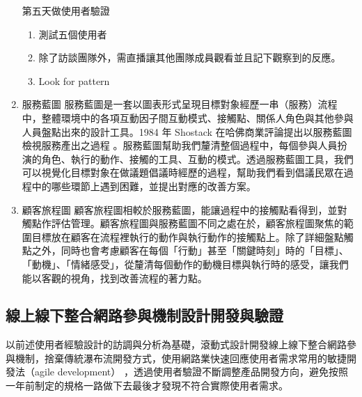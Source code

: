 \documentclass[12pt,a4paper]{article}
\begin{document}
\begin{enumerate}
第五天做使用者驗證
\begin{enumerate}
\item 測試五個使用者
\item 除了訪談團隊外，需直播讓其他團隊成員觀看並且記下觀察到的反應。
\item Look for pattern
\end{enumerate}
\item 服務藍圖
\label{sec:org264b732}
服務藍圖是一套以圖表形式呈現目標對象經歷一串（服務）流程中，整體環境中的各項互動因子間互動模式、接觸點、關係人角色與其他參與人員盤點出來的設計工具。1984 年 Shostack 在哈佛商業評論提出以服務藍圖檢視服務產出之過程 \citep{shostack1984} 。服務藍圖幫助我們釐清整個過程中，每個參與人員扮演的角色、執行的動作、接觸的工具、互動的模式。透過服務藍圖工具，我們可以視覺化目標對象在做議題倡議時經歷的過程，幫助我們看到倡議民眾在過程中的哪些環節上遇到困難，並提出對應的改善方案。
\item 顧客旅程圖
\label{sec:orgefe439f}
顧客旅程圖相較於服務藍圖，能讓過程中的接觸點看得到，並對觸點作評估管理。顧客旅程圖與服務藍圖不同之處在於，顧客旅程圖聚焦的範圍目標放在顧客在流程裡執行的動作與執行動作的接觸點上。除了詳細盤點觸點之外，同時也會考慮顧客在每個「行動」甚至「關鍵時刻」時的「目標」、「動機」、「情緒感受」，從釐清每個動作的動機目標與執行時的感受，讓我們能以客觀的視角，找到改善流程的著力點。
\end{enumerate}

\subsection{線上線下整合網路參與機制設計開發與驗證 }
\label{sec:org0693ad5}
以前述使用者經驗設計的訪調與分析為基礎，滾動式設計開發線上線下整合網路參與機制，捨棄傳統瀑布流開發方式，使用網路業快速回應使用者需求常用的敏捷開發法（agile development） \cite{agile_development} ，透過使用者驗證不斷調整產品開發方向，避免按照一年前制定的規格一路做下去最後才發現不符合實際使用者需求。
\end{document}
